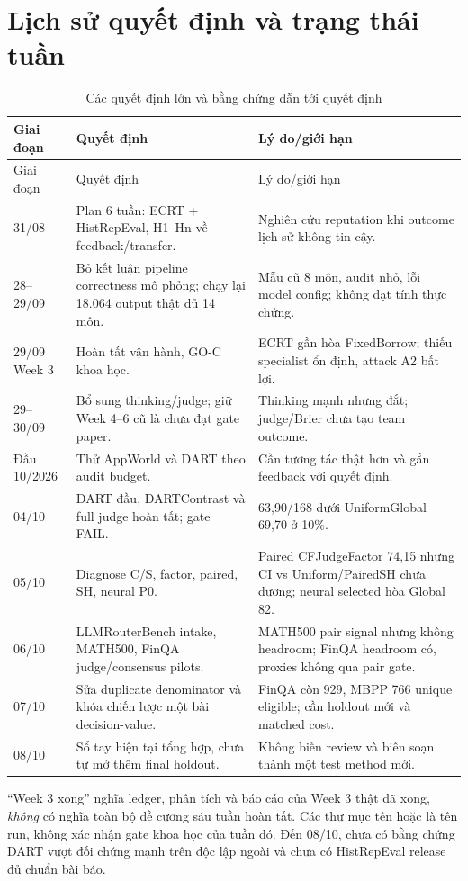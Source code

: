 \documentclass[11pt,a4paper,openany]{book}
\newcommand{\repo}[1]{\path{#1}}
\begin{document}
\chapter{Lịch sử quyết định và trạng thái tuần}\label{chap:timeline}
\begin{longtable}{p{24mm}p{60mm}p{68mm}}\caption{Các quyết định lớn và bằng chứng dẫn tới quyết định}\label{tab:timeline}\\\toprule Giai đoạn & Quyết định & Lý do/giới hạn\\\midrule\endfirsthead\toprule Giai đoạn & Quyết định & Lý do/giới hạn\\\midrule\endhead
31/08 & Plan 6 tuần: ECRT + HistRepEval, H1--Hn về feedback/transfer. & Nghiên cứu reputation khi outcome lịch sử không tin cậy.\\
28--29/09 & Bỏ kết luận pipeline correctness mô phỏng; chạy lại 18.064 output thật đủ 14 môn. & Mẫu cũ 8 môn, audit nhỏ, lỗi model config; không đạt tính thực chứng.\\
29/09 Week 3 & Hoàn tất vận hành, GO-C khoa học. & ECRT gần hòa FixedBorrow; thiếu specialist ổn định, attack A2 bất lợi.\\
29--30/09 & Bổ sung thinking/judge; giữ Week 4--6 cũ là chưa đạt gate paper. & Thinking mạnh nhưng đắt; judge/Brier chưa tạo team outcome.\\
Đầu 10/2026 & Thử AppWorld và DART theo audit budget. & Cần tương tác thật hơn và gắn feedback với quyết định.\\
04/10 & DART đầu, DARTContrast và full judge hoàn tất; gate FAIL. & 63,90/168 dưới UniformGlobal 69,70 ở 10\%.\\
05/10 & Diagnose C/S, factor, paired, SH, neural P0. & Paired CFJudgeFactor 74,15 nhưng CI vs Uniform/PairedSH chưa dương; neural selected hòa Global 82.\\
06/10 & LLMRouterBench intake, MATH500, FinQA judge/consensus pilots. & MATH500 pair signal nhưng không headroom; FinQA headroom có, proxies không qua pair gate.\\
07/10 & Sửa duplicate denominator và khóa chiến lược một bài decision-value. & FinQA còn 929, MBPP 766 unique eligible; cần holdout mới và matched cost.\\
08/10 & Sổ tay hiện tại tổng hợp, chưa tự mở thêm final holdout. & Không biến review và biên soạn thành một test method mới.\\\bottomrule\end{longtable}
``Week 3 xong'' nghĩa ledger, phân tích và báo cáo của Week 3 thật đã xong, \emph{không} có nghĩa toàn bộ đề cương sáu tuần hoàn tất. Các thư mục tên \repo{week4} hoặc \repo{week5} là tên run, không xác nhận gate khoa học của tuần đó. Đến 08/10, chưa có bằng chứng DART vượt đối chứng mạnh trên độc lập ngoài và chưa có HistRepEval release đủ chuẩn bài báo.
\end{document}
